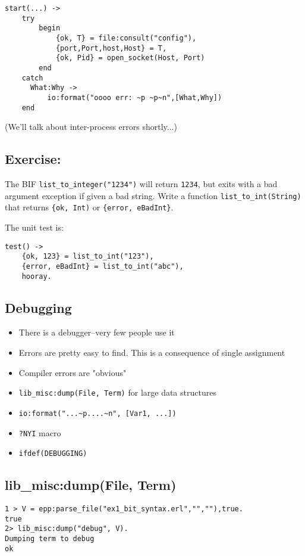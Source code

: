 \documentclass[12pt]{article}
\begin{document}
\begin{verbatim}
start(...) ->
    try
        begin
            {ok, T} = file:consult("config"),
            {port,Port,host,Host} = T,
            {ok, Pid} = open_socket(Host, Port)
        end
    catch
      What:Why ->
          io:format("oooo err: ~p ~p~n",[What,Why])
    end
\end{verbatim}

(We'll talk about inter-process errors shortly...)

\subsection{Exercise:}

The BIF \verb+list_to_integer("1234")+ will return \verb+1234+, but
exits with a bad argument exception if given a bad string. Write a
function \verb+list_to_int(String)+ that returns \verb+{ok, Int)+ or
  \verb+{error, eBadInt}+.

The unit test is:

\begin{verbatim}
test() ->
    {ok, 123} = list_to_int("123"),
    {error, eBadInt} = list_to_int("abc"),
    hooray.
\end{verbatim}

\subsection{Debugging}

\begin{itemize}
\item There is a debugger--very few people use it
\item Errors are pretty easy to find. This is a
consequence of single assignment
\item Compiler errors are "obvious"
\item \verb+lib_misc:dump(File, Term)+ for large data structures
\item \verb+io:format("...~p....~n", [Var1, ...])+
\item \verb+?NYI+ macro
\item \verb+ifdef(DEBUGGING)+
\end{itemize}

\subsection{lib\_misc:dump(File, Term)}


\begin{verbatim} 
1 > V = epp:parse_file("ex1_bit_syntax.erl","",""),true.
true
2> lib_misc:dump("debug", V).
Dumping term to debug
ok
\end{verbatim}
\end{document}
